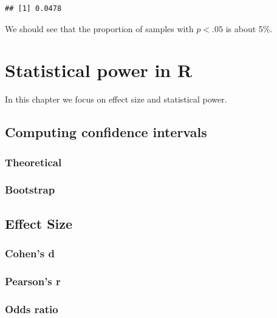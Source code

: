 \documentclass[
  12pt,
]{book}
\begin{document}
\begin{verbatim}
## [1] 0.0478
\end{verbatim}

We should see that the proportion of samples with \(p < .05\) is about 5\%.

\hypertarget{statistical-power-in-r}{%
\chapter{Statistical power in R}\label{statistical-power-in-r}}

In this chapter we focus on effect size and statistical power.

\hypertarget{computing-confidence-intervals}{%
\section{Computing confidence intervals}\label{computing-confidence-intervals}}

\hypertarget{theoretical}{%
\subsection{Theoretical}\label{theoretical}}

\hypertarget{bootstrap}{%
\subsection{Bootstrap}\label{bootstrap}}

\hypertarget{effect-size}{%
\section{Effect Size}\label{effect-size}}

\hypertarget{cohens-d}{%
\subsection{Cohen's d}\label{cohens-d}}

\hypertarget{pearsons-r}{%
\subsection{Pearson's r}\label{pearsons-r}}

\hypertarget{odds-ratio}{%
\subsection{Odds ratio}\label{odds-ratio}}
\end{document}
